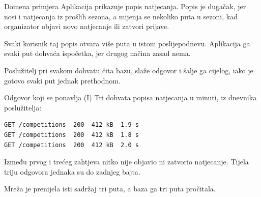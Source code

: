 \begin{frame}{Domena primjera}
Aplikacija prikazuje popis natjecanja. Popis je dugačak, jer nosi i natjecanja iz prošlih sezona, a mijenja se nekoliko puta u sezoni, kad organizator objavi novo natjecanje ili zatvori prijave.

\vspace{0.9em}
Svaki korisnik taj popis otvara više puta u istom poslijepodnevu. Aplikacija ga svaki put dohvaća ispočetka, jer drugog načina zasad nema.

\vspace{0.9em}
Poslužitelj pri svakom dohvatu čita bazu, slaže odgovor i šalje ga cijelog, iako je gotovo svaki put jednak prethodnom.
\end{frame}


\begin{frame}[fragile]{Odgovor koji se ponavlja (I)}
Tri dohvata popisa natjecanja u minuti, iz dnevnika poslužitelja:

\begin{lstlisting}
GET /competitions  200  412 kB  1.9 s
GET /competitions  200  412 kB  1.8 s
GET /competitions  200  412 kB  2.0 s
\end{lstlisting}

\vspace{0.5em}
Između prvog i trećeg zahtjeva nitko nije objavio ni zatvorio natjecanje. Tijela triju odgovora jednaka su do zadnjeg bajta.

\vspace{0.5em}
Mreža je prenijela isti sadržaj tri puta, a baza ga tri puta pročitala.
\end{frame}

